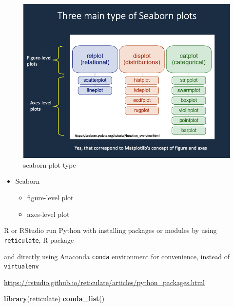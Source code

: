 \documentclass[
]{book}
\newenvironment{Shaded}{\begin{snugshade}}{\end{snugshade}}
\newcommand{\FunctionTok}[1]{\textcolor[rgb]{0.13,0.29,0.53}{\textbf{#1}}}
\newcommand{\NormalTok}[1]{#1}
\providecommand{\tightlist}{%
  \setlength{\itemsep}{0pt}\setlength{\parskip}{0pt}}
\theoremstyle{definition}
\theoremstyle{definition}
\theoremstyle{definition}
\theoremstyle{definition}
\theoremstyle{remark}
\begin{document}
\begin{figure}
\includegraphics[width=1\linewidth]{img/seaborn-plot-type} \caption{seaborn plot type}\label{fig:seaborn-plot-type}
\end{figure}

\begin{itemize}
\tightlist
\item
  Seaborn

  \begin{itemize}
  \tightlist
  \item
    figure-level plot
  \item
    axes-level plot
  \end{itemize}
\end{itemize}

R or RStudio run Python with installing packages or modules by using \texttt{reticulate}, R package

and directly using Anaconda \texttt{conda} environment for convenience, instead of \texttt{virtualenv}

\url{https://rstudio.github.io/reticulate/articles/python_packages.html}

\begin{Shaded}
\begin{Highlighting}[]
\FunctionTok{library}\NormalTok{(reticulate)}
\FunctionTok{conda\_list}\NormalTok{()}
\end{Highlighting}
\end{Shaded}
\end{document}
